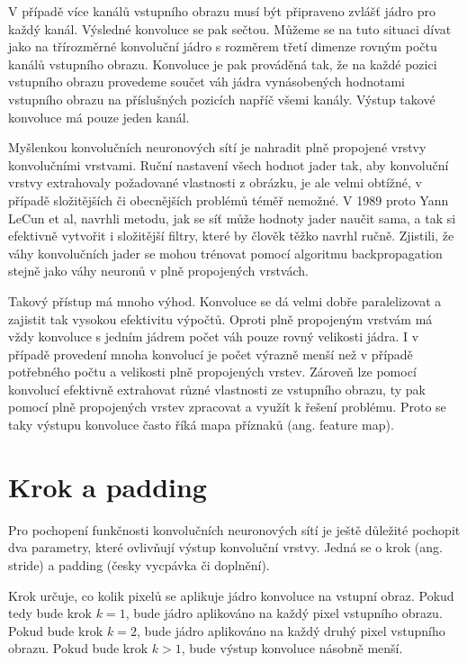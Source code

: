 V případě více kanálů vstupního obrazu musí být připraveno zvlášť jádro pro
každý kanál. Výsledné konvoluce se pak sečtou. Můžeme se na tuto situaci dívat
jako na třírozměrné konvoluční jádro s rozměrem třetí dimenze rovným počtu
kanálů vstupního obrazu. Konvoluce je pak prováděná tak, že na každé pozici
vstupního obrazu provedeme součet váh jádra vynásobených hodnotami vstupního
obrazu na příslušných pozicích napříč všemi kanály. Výstup takové konvoluce má
pouze jeden kanál.

Myšlenkou konvolučních neuronových sítí je nahradit plně propojené vrstvy
konvolučními vrstvami. Ruční nastavení všech hodnot jader tak, aby konvoluční
vrstvy extrahovaly požadované vlastnosti z obrázku, je ale velmi obtížné, v
případě složitějších či obecnějších problémů téměř nemožné. V 1989 proto Yann
LeCun et al, navrhli metodu, jak se síť může hodnoty jader naučit sama, a tak
si efektivně vytvořit i složitější filtry, které by člověk těžko navrhl ručně.
Zjistili, že váhy konvolučních jader se mohou trénovat pomocí algoritmu
backpropagation stejně jako váhy neuronů v plně propojených vrstvách.

Takový přístup má mnoho výhod. Konvoluce se dá velmi dobře paralelizovat a
zajistit tak vysokou efektivitu výpočtů. Oproti plně propojeným vrstvám má vždy
konvoluce s jedním jádrem počet váh pouze rovný velikosti jádra. I v případě
provedení mnoha konvolucí je počet výrazně menší než v případě potřebného počtu
a velikosti plně propojených vrstev. Zároveň lze pomocí konvolucí efektivně
extrahovat různé vlastnosti ze vstupního obrazu, ty pak pomocí plně propojených
vrstev zpracovat a využít k řešení problému. Proto se taky výstupu konvoluce
často říká mapa příznaků (ang. feature map).

\section{Krok a padding}

Pro pochopení funkčnosti konvolučních neuronových sítí je ještě důležité
pochopit dva parametry, které ovlivňují výstup konvoluční vrstvy. Jedná se o
krok (ang. stride) a padding (česky vycpávka či doplnění).

Krok určuje, co kolik pixelů se aplikuje jádro konvoluce na vstupní obraz.
Pokud tedy bude krok $k = 1$, bude jádro aplikováno na každý pixel vstupního
obrazu. Pokud bude krok $k = 2$, bude jádro aplikováno na každý druhý pixel
vstupního obrazu. Pokud bude krok $k > 1$, bude výstup konvoluce násobně menší.

